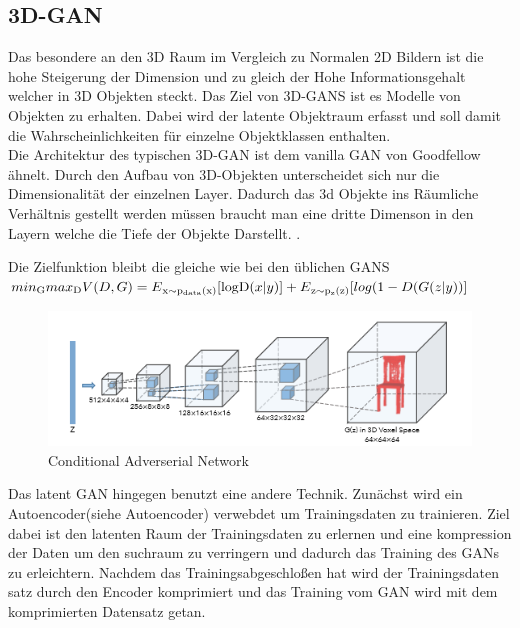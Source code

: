 \documentclass{llncs}
\begin{document}
\subsection{3D-GAN}
Das besondere an den 3D Raum im Vergleich zu Normalen 2D Bildern ist die hohe Steigerung der Dimension und zu gleich der Hohe Informationsgehalt welcher in 3D Objekten steckt. Das Ziel von 3D-GANS ist es Modelle von Objekten zu erhalten. Dabei wird der latente Objektraum erfasst und soll damit die Wahrscheinlichkeiten für einzelne Objektklassen enthalten. 
\\
Die Architektur des typischen 3D-GAN ist dem vanilla GAN von Goodfellow ähnelt. Durch den Aufbau von 3D-Objekten unterscheidet sich nur die Dimensionalität der einzelnen Layer. Dadurch das 3d Objekte ins Räumliche Verhältnis gestellt werden müssen braucht man eine dritte Dimenson in den Layern welche die Tiefe der Objekte Darstellt. \cite{3d}. 

Die Zielfunktion bleibt die gleiche wie bei den üblichen GANS 
\begin{math}
min\textsubscript{G} max\textsubscript{D}V(D,G)=E\textsubscript{x$\sim$p\textsubscript{data}(x)}[\log $D$(x|y)]  + E\textsubscript{z$\sim$p\textsubscript{z}(z)}[log(1-D(G(z|y))]           
\end{math}

\begin{figure}[htbp] 
	\centering
	\includegraphics[width=1.2\textwidth]{3dgan.png}
	\caption{Conditional Adverserial Network}
	\label{fig:Bild2}
\end{figure}
\cite{3d}

Das latent GAN hingegen benutzt eine andere Technik. Zunächst wird ein Autoencoder(siehe Autoencoder) verwebdet um Trainingsdaten zu trainieren. Ziel dabei ist den latenten Raum der Trainingsdaten zu erlernen und eine kompression der Daten um den suchraum zu verringern und dadurch das Training des GANs zu erleichtern. Nachdem das Trainingsabgeschloßen hat wird der Trainingsdaten satz durch den Encoder komprimiert und das Training vom GAN wird mit dem komprimierten Datensatz getan. 
\end{document}
